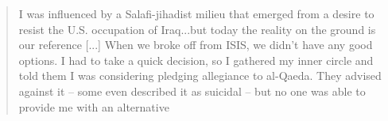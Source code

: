 \begin{quote}
I was influenced by a Salafi-jihadist milieu that emerged from a desire to resist the U.S. occupation of Iraq...but today the reality on the ground is our reference [...] When we broke off from ISIS, we didn't have any good options. I had to take a quick decision, so I gathered my inner circle and told them I was considering pledging allegiance to al-Qaeda. They advised against it – some even described it as suicidal – but no one was able to provide me with an alternative~\autocite{icg2020conversation}\end{quote}




 



